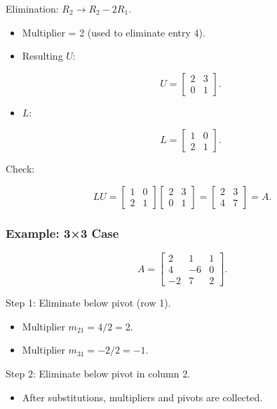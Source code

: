 \documentclass[
  letterpaper,
  DIV=11,
  numbers=noendperiod]{scrreprt}
\providecommand{\tightlist}{%
  \setlength{\itemsep}{0pt}\setlength{\parskip}{0pt}}
\begin{document}
Elimination: \(R_2 \to R_2 - 2R_1\).

\begin{itemize}
\item
  Multiplier = 2 (used to eliminate entry 4).
\item
  Resulting \(U\):

  \[
  U = \begin{bmatrix}  
  2 & 3 \\  
  0 & 1  
  \end{bmatrix}.
  \]
\item
  \(L\):

  \[
  L = \begin{bmatrix}  
  1 & 0 \\  
  2 & 1  
  \end{bmatrix}.
  \]
\end{itemize}

Check:

\[
LU = \begin{bmatrix}  
1 & 0 \\  
2 & 1  
\end{bmatrix}  
\begin{bmatrix}  
2 & 3 \\  
0 & 1  
\end{bmatrix}  
= \begin{bmatrix}  
2 & 3 \\  
4 & 7  
\end{bmatrix} = A.
\]

\subsubsection{Example: 3×3 Case}\label{example-33-case}

\[
A = \begin{bmatrix}  
2 & 1 & 1 \\  
4 & -6 & 0 \\  
-2 & 7 & 2  
\end{bmatrix}.
\]

Step 1: Eliminate below pivot (row 1).

\begin{itemize}
\tightlist
\item
  Multiplier \(m_{21} = 4/2 = 2\).
\item
  Multiplier \(m_{31} = -2/2 = -1\).
\end{itemize}

Step 2: Eliminate below pivot in column 2.

\begin{itemize}
\tightlist
\item
  After substitutions, multipliers and pivots are collected.
\end{itemize}
\end{document}
